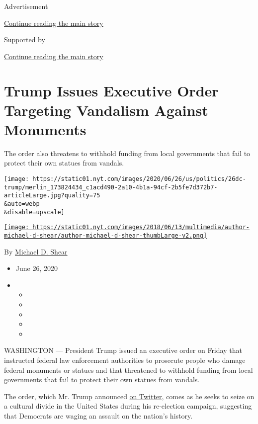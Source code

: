 Advertisement

\protect\hyperlink{after-top}{Continue reading the main story}

Supported by

\protect\hyperlink{after-sponsor}{Continue reading the main story}

\hypertarget{trump-issues-executive-order-targeting-vandalism-against-monuments}{%
\section{Trump Issues Executive Order Targeting Vandalism Against
Monuments}\label{trump-issues-executive-order-targeting-vandalism-against-monuments}}

The order also threatens to withhold funding from local governments that
fail to protect their own statues from vandals.

\texttt{[image: https://static01.nyt.com/images/2020/06/26/us/politics/26dc-trump/merlin\_173824434\_c1acd490-2a10-4b1a-94cf-2b5fe7d372b7-articleLarge.jpg?quality=75\\\&auto=webp\\\&disable=upscale]}

\href{https://www.nytimes.com/by/michael-d-shear}{\texttt{[image: https://static01.nyt.com/images/2018/06/13/multimedia/author-michael-d-shear/author-michael-d-shear-thumbLarge-v2.png]}}

By \href{https://www.nytimes.com/by/michael-d-shear}{Michael D. Shear}

\begin{itemize}
\item
  June 26, 2020
\item
  \begin{itemize}
  \item
  \item
  \item
  \item
  \item
  \end{itemize}
\end{itemize}

WASHINGTON --- President Trump issued an executive order on Friday that
instructed federal law enforcement authorities to prosecute people who
damage federal monuments or statues and that threatened to withhold
funding from local governments that fail to protect their own statues
from vandals.

The order, which Mr. Trump announced
\href{https://twitter.com/realDonaldTrump/status/1276633518433538049}{on
Twitter}, comes as he seeks to seize on a cultural divide in the United
States during his re-election campaign, suggesting that Democrats are
waging an assault on the nation's history.

